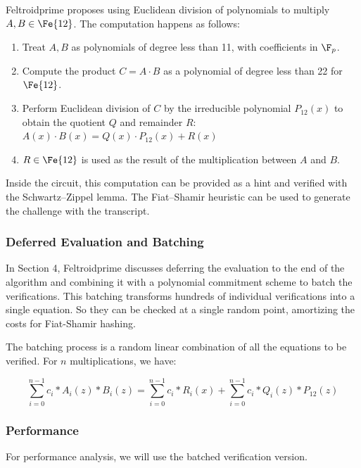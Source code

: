 Feltroidprime proposes using Euclidean division of polynomials to multiply $A, B \in \Fe{12}$. The computation happens as follows:
\begin{enumerate}
    \item Treat $A, B$ as polynomials of degree less than 11, with coefficients in $\F_p$.
    \item Compute the product $C = A \cdot B$ as a polynomial of degree less than 22 for $\Fe{12}$.
    \item Perform Euclidean division of $C$ by the irreducible polynomial $P_{12}(x)$ to obtain the quotient $Q$ and remainder $R$:
    $
    \boxed{A(x) \cdot B(x) = Q(x) \cdot P_{12}(x) + R(x)}
    $
    \item $R \in \Fe{12}$ is used as the result of the multiplication between $A$ and $B$.
\end{enumerate}

Inside the circuit, this computation can be provided as a hint and verified with the Schwartz--Zippel lemma. The Fiat--Shamir heuristic can be used to generate the challenge with the transcript.

\subsubsection{Deferred Evaluation and Batching}

In Section 4, Feltroidprime discusses deferring the evaluation to the end of the algorithm and combining it with a polynomial commitment scheme to batch the verifications. This batching transforms hundreds of individual verifications into a single equation. So they can be checked at a single random point, amortizing the costs for Fiat-Shamir hashing.

The batching process is a random linear combination of all the equations to be verified. For $n$ multiplications, we have:

\begin{equation}
    \label{fxfm_batched}
    \sum_{i=0}^{n-1}{c_i*A_i(z)*B_i(z)} =  \sum_{i=0}^{n-1}{c_i*R_i(x) + \sum_{i=0}^{n-1}{c_i*Q_i(z)*P_{12}(z)}}
\end{equation}

\subsubsection{Performance}

For performance analysis, we will use the batched verification version.

